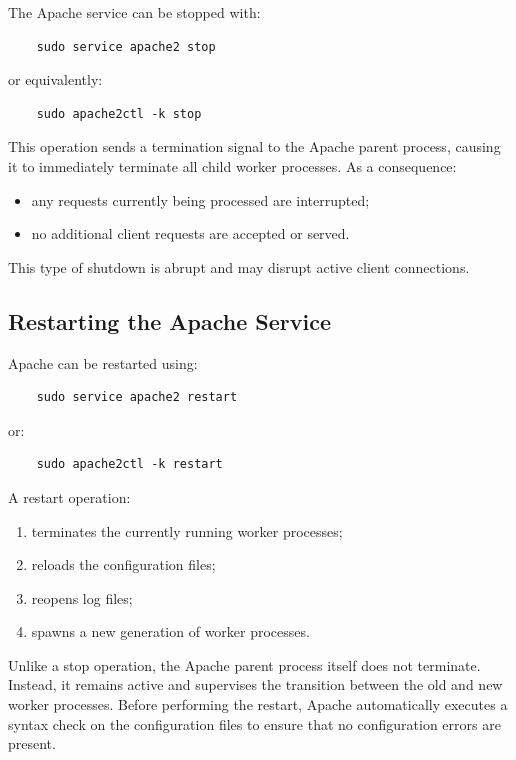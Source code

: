 \documentclass{scrbook}
\begin{document}
	The Apache service can be stopped with:
	
	\begin{lstlisting}
	sudo service apache2 stop
	\end{lstlisting}
	
	or equivalently:
	
	\begin{lstlisting}
	sudo apache2ctl -k stop
	\end{lstlisting}
	
	This operation sends a termination signal to the Apache parent process, causing it to immediately terminate all child worker processes.	As a consequence:
	\begin{itemize}
		\item any requests currently being processed are interrupted;
		
		\item no additional client requests are accepted or served.
	\end{itemize}
	
	This type of shutdown is abrupt and may disrupt active client connections.
	
	\subsection{Restarting the Apache Service}
	
	Apache can be restarted using:
	
	\begin{lstlisting}
	sudo service apache2 restart
	\end{lstlisting}
	
	or:
	
	\begin{lstlisting}
	sudo apache2ctl -k restart
	\end{lstlisting}
	
	A restart operation:
	\begin{enumerate}
		\item terminates the currently running worker processes;
		
		\item reloads the configuration files;
		
		\item reopens log files;
		
		\item spawns a new generation of worker processes.
	\end{enumerate}
	
	Unlike a stop operation, the Apache parent process itself does not terminate. Instead, it remains active and supervises the transition between the old and new worker processes. Before performing the restart, Apache automatically executes a syntax check on the configuration files to ensure that no configuration errors are present.
	
\end{document}
